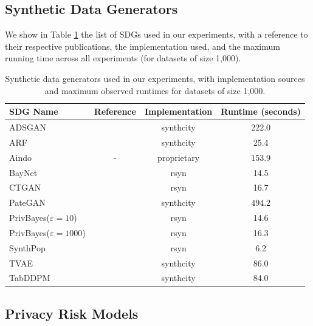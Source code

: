 \subsection{Synthetic Data Generators}
\label{app:sdgs}
We show in Table \ref{tab:sdgs_summary} the list of SDGs used in our experiments, with a reference to their respective publications, the implementation used, and the maximum running time across all experiments (for datasets of size 1,000).
\begin{table}[h]
  \centering
  \caption{Synthetic data generators used in our experiments, with implementation sources and maximum observed runtimes for datasets of size 1,000.}
  \label{tab:sdgs_summary}
  \begin{tabular}{lccc}
    \toprule
    SDG Name & Reference & Implementation & Runtime (seconds)\\
    \midrule
    ADSGAN & \citet{yoon2020anonymization} & synthcity & 222.0 \\
    ARF & \citet{watson2023adversarial} & synthcity & \phantom{0}25.4 \\
    Aindo & - & proprietary & 153.9 \\
    BayNet & \citet{zhang2017privbayes} & rsyn & \phantom{0}14.5 \\
    CTGAN & \citet{xu2019modeling} & rsyn & \phantom{0}16.7 \\
    PateGAN & \citet{jordonpate} & synthcity & 494.2 \\
    PrivBayes($\varepsilon=10$) & \citet{zhang2017privbayes} & rsyn & \phantom{0}14.6 \\
    PrivBayes($\varepsilon=1000$) & \citet{zhang2017privbayes} & rsyn & \phantom{0}16.3 \\
    SynthPop & \citet{nowok2016synthpop} & rsyn & \phantom{00}6.2 \\
    TVAE & \citet{xu2019modeling} & synthcity & \phantom{0}86.0 \\
    TabDDPM & \citet{kotelnikov2023tabddpm} & synthcity & \phantom{0}84.0 \\
    \bottomrule
  \end{tabular}
\end{table}

\subsection{Privacy Risk Models}
\label{app:risk_models}

